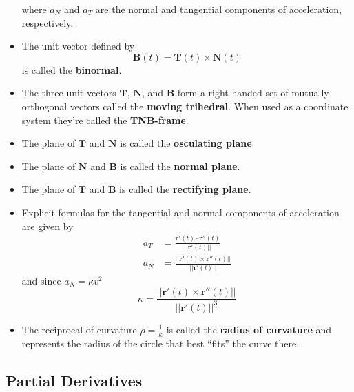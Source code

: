 \documentclass{article}
\begin{document}
\begin{itemize}
        where $a_N$ and $a_T$ are the normal and tangential components of acceleration, respectively.

  \item The unit vector defined by \[\mathbf{B}(t) = \mathbf{T}(t) \times \mathbf{N}(t)\] is called the \textbf{binormal}.

  \item The three unit vectors $\mathbf{T}$, $\mathbf{N}$, and $\mathbf{B}$ form a right-handed set of mutually orthogonal vectors called the \textbf{moving trihedral}. When used as a coordinate system they're called the \textbf{TNB-frame}.

  \item The plane of $\mathbf{T}$ and $\mathbf{N}$ is called the \textbf{osculating plane}.

  \item The plane of $\mathbf{N}$ and $\mathbf{B}$ is called the \textbf{normal plane}.

  \item The plane of $\mathbf{T}$ and $\mathbf{B}$ is called the \textbf{rectifying plane}.

  \item Explicit formulas for the tangential and normal components of acceleration are given by \begin{align*}
          a_T & = \frac{\mathbf{r}'(t) \cdot \mathbf{r}''(t)}{||\mathbf{r}'(t)||}      \\
          a_N & = \frac{||\mathbf{r}'(t) \times \mathbf{r}''(t)||}{||\mathbf{r}'(t)||}
        \end{align*} and since $a_N = \kappa v^2$ \[\kappa = \frac{||\mathbf{r}'(t) \times \mathbf{r}''(t)||}{||\mathbf{r}'(t)||^3}\]

  \item The reciprocal of curvature $\rho = \frac{1}{\kappa}$ is called the \textbf{radius of curvature} and represents the radius of the circle that best ``fits'' the curve there.
\end{itemize}

\subsection{Partial Derivatives}
\end{document}
